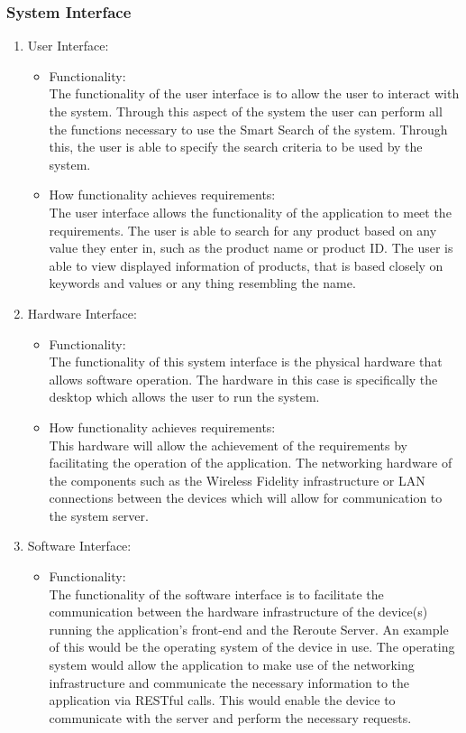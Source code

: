 \documentclass[a4paper,10pt]{article}
\begin{document}
        \subsubsection{System Interface}{
			\begin{enumerate} 
				\item User Interface:
					\begin{itemize}
				\item Functionality:\\
					The functionality of the user interface is to allow the user to interact with the system. Through this aspect of the system the user can perform all the functions necessary to use the Smart Search of the system. Through this, the user is able to specify the search criteria to be used by the system.\\
				\item How functionality achieves requirements:\\	
					The user interface allows the functionality of the application to meet the requirements. The user is able to search for any product based on any value they enter in, such as the product name or product ID. The user is able to view displayed information of products, that is based closely on keywords and values or any thing resembling the name. \\
					\end{itemize}
					
				\item Hardware Interface:
					\begin{itemize}
					\item Functionality:\\
					The functionality of this system interface is the physical hardware that allows software operation. The hardware in this case is specifically the desktop which allows the user to run the system.\\
				\item How functionality achieves requirements:\\
					This hardware will allow the achievement of the requirements by facilitating the operation of the application. The networking hardware of the components such as the Wireless Fidelity infrastructure or LAN connections between the devices which will allow for communication to the system server.
				\end{itemize}
				
				\item Software Interface:
					\begin{itemize}
					\item Functionality:\\
						The functionality of the software interface is to facilitate the communication between the hardware infrastructure of the device(s) running the application's front-end and the Reroute Server. An example of this would be the operating system of the device in use. The operating system would allow the application to make use of the networking infrastructure and communicate the necessary information to the application via RESTful calls. This would enable the device to communicate with the server and perform the necessary requests.\\


\end{itemize}
\end{enumerate}}
\end{document}
